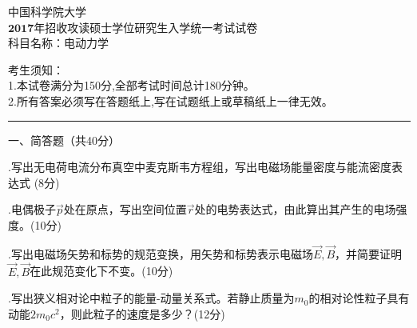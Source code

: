 \begin{center}
	\heiti
	\LARGE{ 中国科学院大学\\ $\boldsymbol{2017}$年招收攻读硕士学位研究生入学统一考试试卷\\
	科目名称：电动力学}

\end{center}
\noindent
考生须知：\\
1.本试卷满分为150分,全部考试时间总计180分钟。\\
2.所有答案必须写在答题纸上,写在试题纸上或草稿纸上一律无效。

\vspace*{2ex}
\hrule
\vspace*{4ex}


\setcounter{page}{1}%
\pagestyle{mypagestyle}

\onehalfspacing

\vspace{0.4cm}

\noindent
一、简答题（共40分）
\vspace{0.2cm}

.\hspace{0.8em}写出无电荷电流分布真空中麦克斯韦方程组，写出电磁场能量密度与能流密度表达式
(8分)\vspace{0.2cm}

.\hspace{0.8em}电偶极子$\Vec{p}$处在原点，写出空间位置$\Vec{r}$处的电势表达式，由此算出其产生的电场强度。(10分)\vspace{0.2cm}

.\hspace{0.8em}写出电磁场矢势和标势的规范变换，用矢势和标势表示电磁场$\Vec{E}, \Vec{B}$，并简要证明$\Vec{E}, \Vec{B}$在此规范变化下不变。(10分)\vspace{0.2cm}

.\hspace{0.8em}写出狭义相对论中粒子的能量-动量关系式。若静止质量为$m_0$的相对论性粒子具有动能$2m_0 c^2$，则此粒子的速度是多少？(12分)\vspace{1cm}

